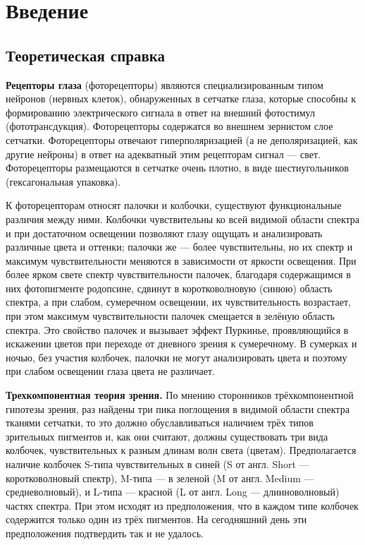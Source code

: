 \documentclass[a4paper,12pt]{article}
\begin{document}

\tableofcontents
\newpage
\section{Введение}
\subsection{Теоретическая справка}

\textbf{Рецепторы глаза} (фоторецепторы) являются специализированным типом нейронов (нервных клеток), обнаруженных в сетчатке глаза, которые способны к формированию электрического сигнала в ответ на внешний фотостимул (фототрансдукция). Фоторецепторы содержатся во внешнем зернистом слое сетчатки. Фоторецепторы отвечают гиперполяризацией (а не деполяризацией, как другие нейроны) в ответ на адекватный этим рецепторам сигнал — свет. Фоторецепторы размещаются в сетчатке очень плотно, в виде шестиугольников (гексагональная упаковка). 


К фоторецепторам относят палочки и колбочки, существуют функциональные различия между ними. Колбочки чувствительны ко всей видимой области спектра и при достаточном освещении позволяют глазу ощущать и анализировать различные цвета и оттенки; палочки же — более чувствительны, но их спектр и максимум чувствительности меняются в зависимости от яркости освещения. При более ярком свете спектр чувствительности палочек, благодаря содержащимся в них фотопигменте родопсине, сдвинут в коротковолновую (синюю) область спектра, а при слабом, сумеречном освещении, их чувствительность возрастает, при этом максимум чувствительности палочек смещается в зелёную область спектра. Это свойство палочек и вызывает эффект Пуркинье, проявляющийся в искажении цветов при переходе от дневного зрения к сумеречному. В сумерках и ночью, без участия колбочек, палочки не могут анализировать цвета и поэтому при слабом освещении глаза цвета не различает.


\textbf{Трехкомпонентная теория зрения.} 
По мнению сторонников трёхкомпонентной гипотезы зрения, раз найдены три пика поглощения в видимой области спектра тканями сетчатки, то это должно обуславливаться наличием трёх типов зрительных пигментов и, как они считают, должны существовать три вида колбочек, чувствительных к разным длинам волн света (цветам). Предполагается наличие колбочек S-типа чувствительных в синей (S от англ. Short — коротковолновый спектр), M-типа — в зеленой (M от англ. Medium — средневолновый), и L-типа — красной (L от англ. Long — длинноволновый) частях спектра. При этом исходят из предположения, что в каждом типе колбочек содержится только один из трёх пигментов. На сегодняшний день эти предположения подтвердить так и не удалось.
\end{document}
